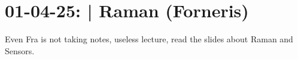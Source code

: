\section{01-04-25: | Raman (Forneris)}

Even Fra is not taking notes, useless lecture, read the slides about Raman and Sensors.